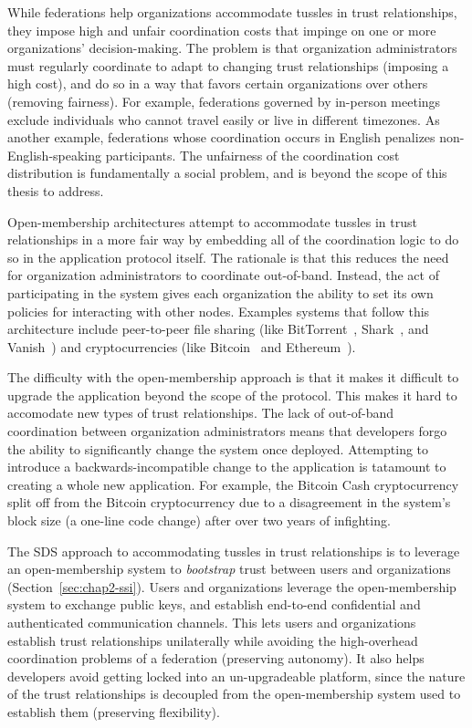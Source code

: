 While federations help organizations accommodate
tussles in trust relationships, they impose high and unfair coordination costs
that impinge on one or more organizations' decision-making.  The problem is 
that organization administrators must regularly coordinate to adapt
to changing trust relationships (imposing a high cost), and do so in a way that
favors certain organizations over others (removing fairness).  For example,
federations governed by in-person meetings exclude individuals who cannot
travel easily or live in different timezones.
As another example, federations whose coordination occurs in English
penalizes non-English-speaking participants.  The unfairness of the
coordination cost distribution is fundamentally a social problem, and is beyond
the scope of this thesis to address.

Open-membership architectures attempt to accommodate tussles in trust
relationships in a more fair way by embedding all of the coordination logic to do so in the
application protocol itself.  The rationale is
that this reduces the need for organization administrators to coordinate
out-of-band.  Instead, the act of participating in the system gives
each organization the ability to set its own policies for interacting with other
nodes.  Examples systems that follow this architecture include peer-to-peer file sharing
(like BitTorrent~\cite{bittorrent}, Shark~\cite{shark}, and Vanish~\cite{vanish})
and cryptocurrencies (like Bitcoin~\cite{bitcoin} and Ethereum~\cite{ethereum}).

The difficulty with the open-membership approach is that
it makes it difficult to upgrade the application beyond the scope of the
protocol.  This makes it hard to accomodate new types of trust relationships.
The lack of out-of-band coordination between organization
administrators means that developers forgo the ability to significantly change the
system once deployed.  Attempting to introduce a backwards-incompatible change to the
application is tatamount to creating a whole new application.  For example,
the Bitcoin Cash cryptocurrency~\cite{bcash} split off from the Bitcoin
cryptocurrency due to a disagreement in the system's block size (a one-line code
change) after over two years of infighting.

The SDS approach to accommodating tussles in trust relationships is to leverage
an open-membership system to \emph{bootstrap} trust between
users and organizations (Section~\ref{sec:chap2-ssi}).  Users and
organizations leverage the open-membership system to exchange public keys, and
establish end-to-end confidential and authenticated communication channels.
This lets users and organizations establish trust relationships unilaterally while
avoiding the high-overhead coordination problems of a
federation (preserving autonomy).
It also helps developers avoid getting locked into an un-upgradeable platform,
since the nature of the trust relationships is decoupled from the
open-membership system used to establish them (preserving flexibility).

